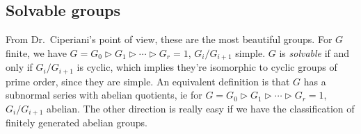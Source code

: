 \subsection{Solvable groups}
From Dr.\ Ciperiani's point of view, these are the most beautiful groups. For $G$ finite, we have $G=G_0\triangleright G_1\triangleright\cdots\triangleright G_r=1$, $G_i /G_{i+1}$ simple. $G$ is \emph{solvable} if and only if $G_i/ G_{i+1}$ is cyclic, which implies they're isomorphic to cyclic groups of prime order, since they are simple. An equivalent definition is that $G$ has a subnormal series with abelian quotients, ie for $G=G_0\triangleright G_1\triangleright\cdots\triangleright G_r=1$, $G_i /G_{i+1}$ abelian. The other direction is really easy if we have the classification of finitely generated abelian groups.


